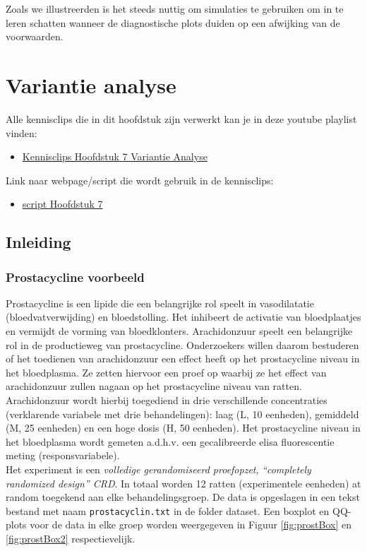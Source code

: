 \documentclass[
  12pt,dutch,coursenotes]{book}
\providecommand{\tightlist}{%
  \setlength{\itemsep}{0pt}\setlength{\parskip}{0pt}}
\theoremstyle{definition}
\theoremstyle{definition}
\theoremstyle{definition}
\theoremstyle{remark}
\begin{document}
Zoals we illustreerden is het steeds nuttig om simulaties te gebruiken om in te leren schatten wanneer de diagnostische plots duiden op een afwijking van de voorwaarden.

\hypertarget{chap:anova}{%
\chapter{Variantie analyse}\label{chap:anova}}

Alle kennisclips die in dit hoofdstuk zijn verwerkt kan je in deze youtube playlist vinden:

\begin{itemize}
\tightlist
\item
  \href{https://www.ayoutube.com/playlist?list=PLZH1hP8_LbJIBVGNQ61zxMgc2srezPpnB}{Kennisclips Hoofdstuk 7 Variantie Analyse}
\end{itemize}

Link naar webpage/script die wordt gebruik in de kennisclips:

\begin{itemize}
\tightlist
\item
  \href{https://statomics.github.io/sbc20/rmd/07-Anova.html}{script Hoofdstuk 7}
\end{itemize}

\hypertarget{inleiding-6}{%
\section{Inleiding}\label{inleiding-6}}

\hypertarget{prostacycline-voorbeeld}{%
\subsection{Prostacycline voorbeeld}\label{prostacycline-voorbeeld}}

Prostacycline is een lipide die een belangrijke rol speelt in vasodilatatie (bloedvatverwijding) en bloedstolling.
Het inhibeert de activatie van bloedplaatjes en vermijdt de vorming van bloedklonters.
Arachidonzuur speelt een belangrijke rol in de productieweg van prostacycline.
Onderzoekers willen daarom bestuderen of het toedienen van arachidonzuur een effect heeft op het prostacycline niveau in het bloedplasma.
Ze zetten hiervoor een proef op waarbij ze het effect van arachidonzuur zullen nagaan op het prostacycline niveau van ratten.
Arachidonzuur wordt hierbij toegediend in drie verschillende concentraties (verklarende variabele met drie behandelingen): laag (L, 10 eenheden), gemiddeld (M, 25 eenheden) en een hoge dosis (H, 50 eenheden).
Het prostacycline niveau in het bloedplasma wordt gemeten a.d.h.v. een gecalibreerde elisa fluorescentie meting (responsvariabele).\\
Het experiment is een \emph{volledige gerandomiseerd proefopzet}, \emph{``completely randomized design'' CRD}. In totaal worden 12 ratten (experimentele eenheden) at random toegekend aan elke behandelingsgroep.
De data is opgeslagen in een tekst bestand met naam \texttt{prostacyclin.txt} in de folder dataset.
Een boxplot en QQ-plots voor de data in elke groep worden weergegeven in Figuur \ref{fig:prostBox} en \ref{fig:prostBox2} respectievelijk.
\end{document}
